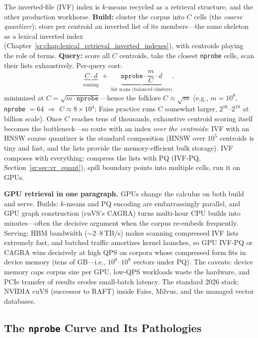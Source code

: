 The inverted-file (IVF) index is $k$-means recycled as a retrieval structure, and the other production workhorse. \textbf{Build:} cluster the corpus into $C$ cells (the \emph{coarse quantizer}); store per centroid an inverted list of its members---the same skeleton as a lexical inverted index (Chapter~\ref{sr:chap:lexical_retrieval_inverted_indexes}), with centroids playing the role of terms. \textbf{Query:} score all $C$ centroids, take the closest \texttt{nprobe} cells, scan their lists exhaustively. Per-query cost:
\begin{equation}
\underbrace{C \cdot d}_{\text{routing}} \; + \; \underbrace{\texttt{nprobe} \cdot \frac{m}{C} \cdot d}_{\text{list scans (balanced clusters)}},
\end{equation}
minimized at $C = \sqrt{m \cdot \texttt{nprobe}}$---hence the folklore $C \approx \sqrt{m}$ (e.g., $m = 10^8$, \texttt{nprobe} $= 64$ $\Rightarrow$ $C \approx 8 \times 10^4$; Faiss practice runs $C$ somewhat larger, $2^{16}$--$2^{18}$ at billion scale). Once $C$ reaches tens of thousands, exhaustive centroid scoring itself becomes the bottleneck---so route with an index \emph{over the centroids}: IVF with an HNSW coarse quantizer is the standard composition (HNSW over $10^5$ centroids is tiny and fast, and the lists provide the memory-efficient bulk storage). IVF composes with everything: compress the lists with PQ (IVF-PQ, Section~\ref{sr:sec:vr_quant}), spill boundary points into multiple cells, run it on GPUs.

\textbf{GPU retrieval in one paragraph.} GPUs change the calculus on both build and serve. Builds: $k$-means and PQ encoding are embarrassingly parallel, and GPU graph construction (cuVS's CAGRA) turns multi-hour CPU builds into minutes---often the decisive argument when the corpus re-embeds frequently. Serving: HBM bandwidth ($\sim$2--8\,TB/s) makes scanning compressed IVF lists extremely fast, and batched traffic amortizes kernel launches, so GPU IVF-PQ or CAGRA wins decisively at high QPS on corpora whose compressed form fits in device memory (tens of GB---i.e., $10^8$--$10^9$ vectors under PQ). The caveats: device memory caps corpus size per GPU, low-QPS workloads waste the hardware, and PCIe transfer of results erodes small-batch latency. The standard 2026 stack: NVIDIA cuVS (successor to RAFT) inside Faiss, Milvus, and the managed vector databases.

\subsection{The \texttt{nprobe} Curve and Its Pathologies}


